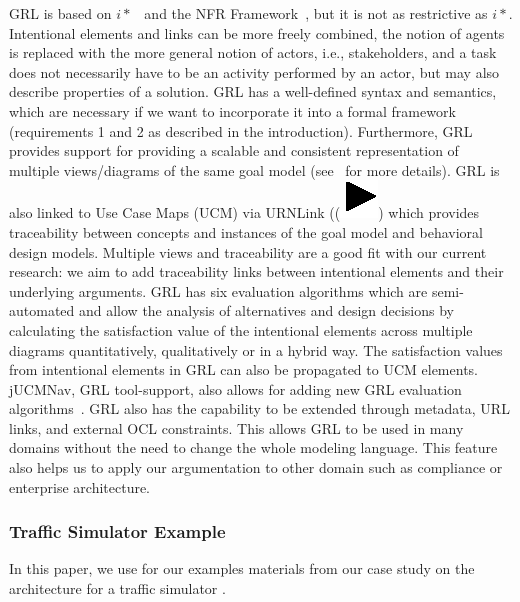 GRL is based on $i*$~\cite{Yu:1997:TMR:827255.827807} and the NFR Framework~\cite{chung2012non}, but it is not as restrictive as $i*$. Intentional elements and links can be more freely combined, the notion of agents is replaced with the more general notion of actors, i.e., stakeholders, and a task does not necessarily have to be an activity performed by an actor, but may also describe properties of a solution. GRL has a well-defined syntax and semantics, which are necessary if we want to incorporate it into a formal framework (requirements 1 and 2 as described in the introduction). Furthermore, GRL provides support for providing a scalable and consistent representation of multiple views/diagrams of the same goal model (see~\cite[Ch.2]{Ghanavati2013} for more details). GRL is also linked to Use Case Maps (UCM) via URNLink ((\includegraphics[scale=1]{img/urnlink}) which provides traceability between concepts and instances of the goal model and behavioral design models. Multiple views and traceability are a good fit with our current research: we aim to add traceability links between intentional elements and their underlying arguments. GRL has six evaluation algorithms which are semi-automated and allow the analysis of alternatives and design decisions by calculating the satisfaction value of the intentional elements across multiple diagrams quantitatively, qualitatively or in a hybrid way. The satisfaction values from intentional elements in GRL can also be propagated to UCM elements.  jUCMNav, GRL tool-support, also allows for adding new GRL evaluation algorithms~\cite{}. GRL also has the capability to be extended through metadata, URL links, and external OCL constraints. This allows GRL to be used in many domains without the need to change the whole modeling language. This feature also helps us to apply our argumentation to other domain such as compliance or enterprise architecture. 

\subsubsection{Traffic Simulator Example} %
\label{sect:background:casestudy}

In this paper, we use for our examples materials from our case study on the architecture for a traffic simulator \cite{}. 

